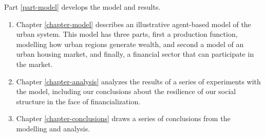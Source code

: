 Part \ref{part-model} develops the model and results.
\begin{enumerate}
    \item Chapter \ref{chapter-model} describes an illustrative agent-based model of the urban system. 
    This model has three  parts, first a production function, modelling how urban regions generate wealth, and second a model of an urban housing market, and finally, a financial sector that can participate in the market. 
    \item Chapter \ref{chapter-analysis} analyzes the results of a series of experiments with the model, including our conclusions about the resilience of our social structure in the face of financialization.
    \item Chapter \ref{chapter-conclusions} draws a series of conclusions from the modelling and analysis.
\end{enumerate}